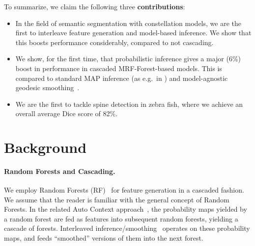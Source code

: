 \documentclass[10pt,twocolumn,letterpaper]{article}
\begin{document}
To summarize, we claim the following three {\bf contributions}:
\begin{itemize}
\item In the field of semantic segmentation with constellation models, we are the first to interleave feature generation and model-based inference. We show that this boosts performance considerably, compared to not cascading. 
\item We show, for the first time, that probabilistic inference gives a major (6\%) boost in performance in cascaded MRF-Forest-based models. This is compared to standard MAP inference (as e.g.\ in \cite{Glocker2013,SeifertAnatomicalSPIE2009,TeethMICCAI2012}) and model-agnostic geodesic smoothing~\cite{GeoForests2013,CriminisiAbdominalIPMI2011}. 
\item We are the first to tackle spine detection in zebra fish, where we achieve an overall average Dice score of 82\%.
\end{itemize}




\section{Background}

\paragraph{Random Forests and Cascading. }
We employ Random Forests (RF)~\cite{BreimanRF} for feature generation in a cascaded fashion.
%
We assume that the reader is familiar with the general concept of Random Forests. 
%
In the related Auto Context approach~\cite{AutoContext2008}, the probability maps yielded by a random forest are fed as features into subsequent random forests, yielding a cascade of forests.  
%
Interleaved inference/smoothing~\cite{DTF,RTF,UweCVPR2013,GeoForests2013} operates on these probability maps, and feeds ``smoothed'' versions of them into the next forest. 
%
\end{document}

